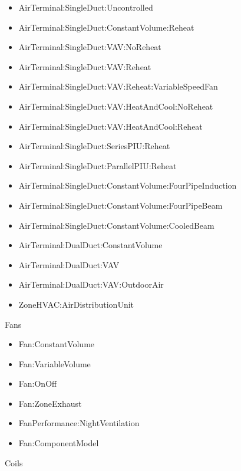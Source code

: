 \begin{itemize}
\tightlist
\item
  AirTerminal:SingleDuct:Uncontrolled
\item
  AirTerminal:SingleDuct:ConstantVolume:Reheat
\item
  AirTerminal:SingleDuct:VAV:NoReheat
\item
  AirTerminal:SingleDuct:VAV:Reheat
\item
  AirTerminal:SingleDuct:VAV:Reheat:VariableSpeedFan
\item
  AirTerminal:SingleDuct:VAV:HeatAndCool:NoReheat
\item
  AirTerminal:SingleDuct:VAV:HeatAndCool:Reheat
\item
  AirTerminal:SingleDuct:SeriesPIU:Reheat
\item
  AirTerminal:SingleDuct:ParallelPIU:Reheat
\item
  AirTerminal:SingleDuct:ConstantVolume:FourPipeInduction
\item
  AirTerminal:SingleDuct:ConstantVolume:FourPipeBeam
\item
  AirTerminal:SingleDuct:ConstantVolume:CooledBeam
\item
  AirTerminal:DualDuct:ConstantVolume
\item
  AirTerminal:DualDuct:VAV
\item
  AirTerminal:DualDuct:VAV:OutdoorAir
\item
  ZoneHVAC:AirDistributionUnit
\end{itemize}

Fans

\begin{itemize}
\tightlist
\item
  Fan:ConstantVolume
\item
  Fan:VariableVolume
\item
  Fan:OnOff
\item
  Fan:ZoneExhaust
\item
  FanPerformance:NightVentilation
\item
  Fan:ComponentModel
\end{itemize}

Coils

